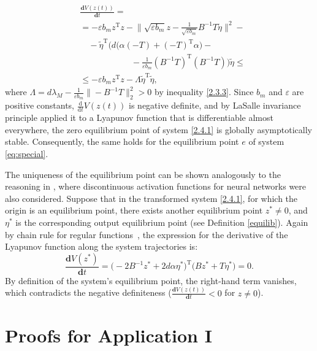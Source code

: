 \documentclass[journal]{IEEEtran}
\begin{document}
\begin{IEEEproof}
\begin{equation*}
\begin{aligned}
&\frac{\mathbf{d}V(z(t))}{\mathbf{d}t}  =  \\
&=-\varepsilon b_m z^{\mathrm{T}}z -\bigg\|\sqrt{\varepsilon b_m} z - \frac{1}{\sqrt{\varepsilon b_m}} B^{-1}T \widetilde{\eta} \bigg\|^2-\\
& \quad- \widetilde{\eta}^{\mathrm{T}}\bigg(d \big(\alpha(-T)+(-T)^{\mathrm{T}}\alpha\big) - \\&~~~~~~~~~~~~~~~~~~~~~~~~~~~-\frac{1}{\varepsilon b_m}(B^{-1}T)^{\mathrm{T}}(B^{-1}T)\bigg) \widetilde{\eta} \leqslant\\
& \leqslant-\varepsilon b_m z^\mathrm{T}z - \Lambda \widetilde{\eta}^{\mathrm{T}}\widetilde{\eta},
\end{aligned} 
\end{equation*}
where $\Lambda = d \lambda_M - \frac{1}{\varepsilon b_m}\|-B^{-1}T\|^2_2>0$ by inequality \eqref{2.3.3}. Since $b_m$ and $\varepsilon$ are positive constants, $\frac{\mathrm{d}}{\mathrm{d} t} V(z(t))$ is negative definite, and by LaSalle invariance principle \cite[Cor. 4.2, p. 129]{p223} applied it to a Lyapunov function that is differentiable almost everywhere, the zero equilibrium point of system \eqref{2.4.1} is globally asymptotically stable. Consequently, the same holds for the equilibrium point $e$ of system \eqref{eq:special}. 

The uniqueness of the equilibrium point can be shown analogously to the reasoning in \cite{eq_ref_11, period_din, eq_ref_2}, where discontinuous activation functions for neural networks were also considered. Suppose that in the transformed system \eqref{2.4.1}, for which the origin is an equilibrium point, there exists another equilibrium point $z^* \ne 0$, and $\eta^*$ is the corresponding output equilibrium point (see Definition \ref{equilib}). Again by chain rule for regular functions~\cite{p9}, the expression for the derivative of the Lyapunov function along the system trajectories is:
\[
\frac{\mathbf{d}V(z^*)}{\mathbf{d}t} = \big(-2B^{-1}z^*+2d\alpha {\eta^*}\big)^{\mathrm{T}}\big(Bz^*+T {\eta}^*) = 0 .
\]
By definition of the system's equilibrium point, the right-hand term vanishes, which contradicts the negative definiteness ($\frac{\mathbf{d}V(z(t))}{\mathbf{d}t} < 0 $ for $z \ne 0$).
\end{IEEEproof}

\section{Proofs for Application I}\label{app:control-proofs}
\end{document}
